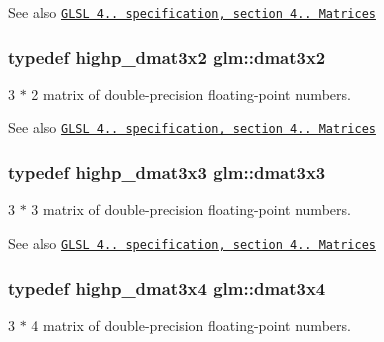 \begin{DoxySeeAlso}{See also}
\href{http://www.opengl.org/registry/doc/GLSLangSpec.4.20.8.pdf}{\tt G\+L\+SL 4.. specification, section 4.. Matrices} 
\end{DoxySeeAlso}
\subsubsection[{\texorpdfstring{dmat3x2}{dmat3x2}}]{\setlength{\rightskip}{0pt plus 5cm}typedef highp\+\_\+dmat3x2 {\bf glm\+::dmat3x2}}\hypertarget{group__core__types_ga2db259d2e7921065c5b7d4dca9547960}{}\label{group__core__types_ga2db259d2e7921065c5b7d4dca9547960}
3 $\ast$ 2 matrix of double-\/precision floating-\/point numbers.

\begin{DoxySeeAlso}{See also}
\href{http://www.opengl.org/registry/doc/GLSLangSpec.4.20.8.pdf}{\tt G\+L\+SL 4.. specification, section 4.. Matrices} 
\end{DoxySeeAlso}
\subsubsection[{\texorpdfstring{dmat3x3}{dmat3x3}}]{\setlength{\rightskip}{0pt plus 5cm}typedef highp\+\_\+dmat3x3 {\bf glm\+::dmat3x3}}\hypertarget{group__core__types_gaf3c29c4f75a448f308463e75ca2efd4c}{}\label{group__core__types_gaf3c29c4f75a448f308463e75ca2efd4c}
3 $\ast$ 3 matrix of double-\/precision floating-\/point numbers.

\begin{DoxySeeAlso}{See also}
\href{http://www.opengl.org/registry/doc/GLSLangSpec.4.20.8.pdf}{\tt G\+L\+SL 4.. specification, section 4.. Matrices} 
\end{DoxySeeAlso}
\subsubsection[{\texorpdfstring{dmat3x4}{dmat3x4}}]{\setlength{\rightskip}{0pt plus 5cm}typedef highp\+\_\+dmat3x4 {\bf glm\+::dmat3x4}}\hypertarget{group__core__types_ga19e745a83cba85f57afa1232276dcc96}{}\label{group__core__types_ga19e745a83cba85f57afa1232276dcc96}
3 $\ast$ 4 matrix of double-\/precision floating-\/point numbers.

